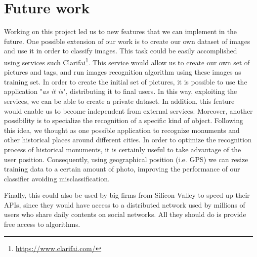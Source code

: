 \section{Future work}
\label{sec:future}

Working on this project led us to new features that we can implement in the 
future.
One possible extension of our work is to create our own dataset of images and 
use it in order to classify images. This task could be easily accomplished using 
services such Clarifai\footnote{\url{https://www.clarifai.com/}}. This service 
would allow us to create our own set of pictures and tags, and run images 
recognition algorithm using these images as training set. In order to create the 
initial set of pictures, it is possible to use the application "\textit{as it 
is}", distributing it to final users. In this way, exploiting the services, we 
can be able to create a private dataset. In addition, this feature would enable 
us to become independent from external services.
Moreover, another possibility is to specialize the recognition of a specific 
kind of object. Following this idea, we thought as one possible application to 
recognize monuments and other historical places around different cities. In 
order to optimize the recognition process of historical monuments, it is 
certainly useful to take advantage of the user position. Consequently, using 
geographical position (i.e. GPS) we can resize training data to a certain amount 
of photo, improving the performance of our classifier avoiding 
misclassification.

Finally, this could also be used by big firms from Silicon Valley to speed up 
their APIs, since they would have access to a distributed network used by 
millions of users who share daily contents on social networks. All they should 
do is provide free access to algorithms.